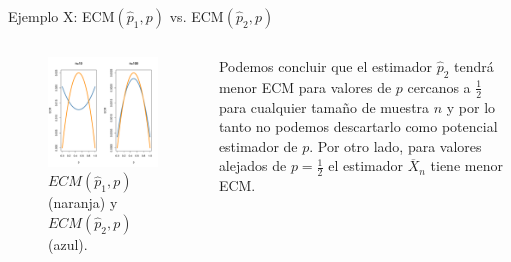 \documentclass{beamer}
\theoremstyle{definition}
\begin{document}
\begin{frame}{\color{rosee}Ejemplo X: \color{orang} ECM$(\widehat{p}_{1},p)$ \color{rosee}vs. \color{dodgerblue} ECM$(\widehat{p}_{2},p)$}\small
\begin{columns}
  \begin{column}{7cm}
      \begin{figure}
    \centering
    \includegraphics[height=.6\textheight]{slides3/img/ECM-bernoulli.pdf}
    \caption{\small\color{orang}$ECM(\widehat{p}_{1},p)$ (naranja) \color{black} y \color{dodgerblue}
      $ECM(\widehat{p}_{2},p)$ (azul)\color{black}.}
  \end{figure}
  \end{column}
  \begin{column}{5cm}
   { \small Podemos concluir que el estimador \color{dodgerblue}$\widehat{p}_2$ tendrá menor ECM para valores de $p$ cercanos a $\frac{1}{2}$ \color{black} para cualquier tamaño de muestra $n$ y por lo tanto no podemos descartarlo como potencial estimador de $p$. Por otro lado, \color{orang} para valores alejados de $p=\frac{1}{2}$ el estimador $\overline{X}_n$ tiene menor ECM\color{black}.}
  \end{column}
\end{columns}
\end{frame}
\end{document}
